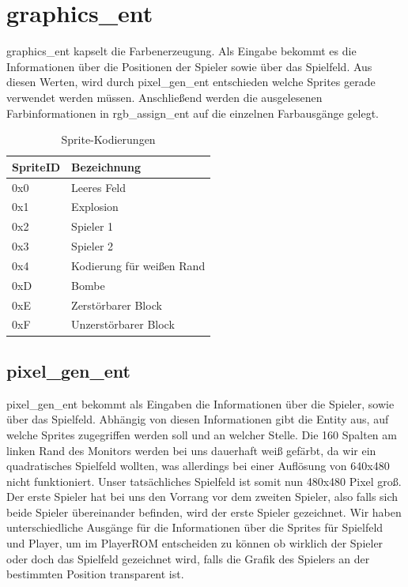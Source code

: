 \documentclass[parskip=full]{scrartcl}
\begin{document}
		\section{graphics\_ent}
			graphics\_ent kapselt die Farbenerzeugung. Als Eingabe bekommt es die Informationen über die Positionen der Spieler sowie über das Spielfeld. Aus diesen Werten, wird durch pixel\_gen\_ent entschieden welche Sprites gerade verwendet werden müssen. Anschließend werden die ausgelesenen Farbinformationen in rgb\_assign\_ent auf die einzelnen Farbausgänge gelegt.\newline
			\begin{table}[]
				\centering
				\caption{Sprite-Kodierungen}
				\label{spriteCode}
				\begin{tabular}{|l|l|}
					\hline
					\textbf{SpriteID} & \textbf{Bezeichnung}      \\ \hline
					0x0           & Leeres Feld               \\ \hline
					0x1           & Explosion                 \\ \hline
					0x2           & Spieler 1                 \\ \hline
					0x3           & Spieler 2                 \\ \hline
					0x4           & Kodierung für weißen Rand \\ \hline
					0xD           & Bombe                     \\ \hline
					0xE           & Zerstörbarer Block        \\ \hline
					0xF           & Unzerstörbarer Block      \\ \hline
				\end{tabular}
			\end{table}
			
			\subsection{pixel\_gen\_ent}
				pixel\_gen\_ent bekommt als Eingaben die Informationen über die Spieler, sowie über das Spielfeld. Abhängig von diesen Informationen gibt die Entity aus, auf welche Sprites zugegriffen werden soll und an welcher Stelle.\newline
				Die 160 Spalten am linken Rand des Monitors werden bei uns dauerhaft weiß gefärbt, da wir ein quadratisches Spielfeld wollten, was allerdings bei einer Auflösung von 640x480 nicht funktioniert. Unser tatsächliches Spielfeld ist somit nun 480x480 Pixel groß.\newline
				Der erste Spieler hat bei uns den Vorrang vor dem zweiten Spieler, also falls sich beide Spieler übereinander befinden, wird der erste Spieler gezeichnet.\newline
				Wir haben unterschiedliche Ausgänge für die Informationen über die Sprites für Spielfeld und Player, um im PlayerROM entscheiden zu können ob wirklich der Spieler oder doch das Spielfeld gezeichnet wird, falls die Grafik des Spielers an der bestimmten Position transparent ist.
		
\end{document}
